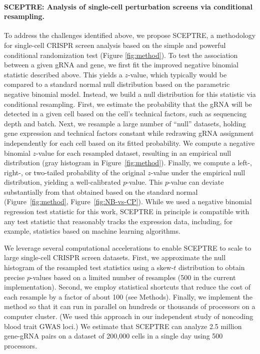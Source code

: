 \documentclass{article}
\begin{document}
\paragraph{SCEPTRE: Analysis of single-cell perturbation screens via conditional resampling.} 

To address the challenges identified above, we propose SCEPTRE, a methodology for single-cell CRISPR screen analysis based on the simple and powerful conditional randomization test\cite{CetL16} (Figure \ref{fig:method}). To test the association between a given gRNA and gene, we first fit the improved negative binomial statistic described above. This yields a $z$-value, which typically would be compared to a standard normal null distribution based on the parametric negative binomial model. Instead, we build a null distribution for this statistic via conditional resampling. First, we estimate the probability that the gRNA will be detected in a given cell based on the cell's technical factors, such as sequencing depth and batch. Next, we resample a large number of  ``null'' datasets, holding gene expression and technical factors constant while redrawing gRNA assignment independently for each cell based on its fitted probability. We compute a negative binomial $z$-value for each resampled dataset, resulting in an empirical null distribution (gray histogram in Figure~\ref{fig:method}). Finally, we compute a left-, right-, or two-tailed probability of the original $z$-value under the empirical null distribution, yielding a well-calibrated $p$-value. This $p$-value can deviate substantially from that obtained based on the standard normal (Figure~\ref{fig:method}, Figure~\ref{fig:NB-vs-CP}). While we used a negative binomial regression test statistic for this work, SCEPTRE in principle is compatible with any test statistic that reasonably tracks the expression data, including, for example, statistics based on machine learning algorithms.

We leverage several computational accelerations to enable SCEPTRE to scale to large single-cell CRISPR screen datasets. First, we approximate the null histogram of the resampled test statistics using a skew-$t$ distribution to obtain precise $p$-values based on a limited number of resamples (500 in the current implementation). Second, we employ statistical shortcuts that reduce the cost of each resample by a factor of about 100 (see Methods). Finally, we implement the method so that it can run in parallel on hundreds or thousands of processors on a computer cluster. (We used this approach in our independent study of noncoding blood trait GWAS loci\cite{Morris2021}.) We estimate that SCEPTRE can analyze 2.5 million gene-gRNA pairs on a dataset of 200,000 cells in a single day using 500 processors.
\end{document}
